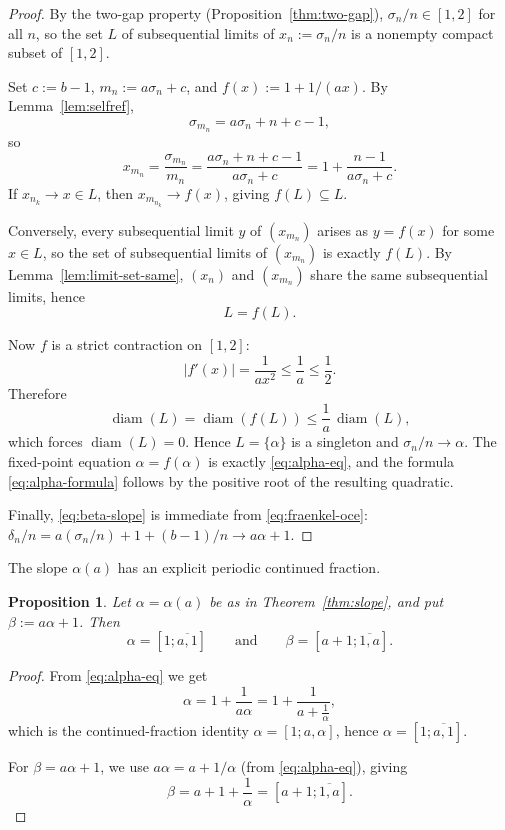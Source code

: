 \documentclass[11pt]{article}
\numberwithin{equation}{section}
\theoremstyle{plain}
\newtheorem{proposition}[theorem]{Proposition}
\theoremstyle{definition}
\theoremstyle{remark}
\begin{document}
\begin{proof}
By the two-gap property (Proposition~\ref{thm:two-gap}), $\sigma_n/n\in[1,2]$
for all $n$, so the set $L$ of subsequential limits of $x_n:=\sigma_n/n$ is a
nonempty compact subset of $[1,2]$.

Set $c:=b-1$, $m_n:=a\sigma_n+c$, and $f(x):=1+1/(ax)$.
By Lemma~\ref{lem:selfref},
\[
  \sigma_{m_n} = a\sigma_n + n + c - 1,
\]
so
\[
  x_{m_n}
  = \frac{\sigma_{m_n}}{m_n}
  = \frac{a\sigma_n+n+c-1}{a\sigma_n+c}
  = 1 + \frac{n-1}{a\sigma_n+c}.
\]
If $x_{n_k}\to x\in L$, then $x_{m_{n_k}}\to f(x)$, giving $f(L)\subseteq L$.

Conversely, every subsequential limit $y$ of $(x_{m_n})$ arises as $y=f(x)$
for some $x\in L$, so the set of subsequential limits of $(x_{m_n})$ is exactly
$f(L)$.  By Lemma~\ref{lem:limit-set-same}, $(x_n)$ and $(x_{m_n})$ share the
same subsequential limits, hence
\[
  L = f(L).
\]

Now $f$ is a strict contraction on $[1,2]$:
\[
  |f'(x)| = \frac{1}{ax^2} \le \frac{1}{a} \le \frac{1}{2}.
\]
Therefore
\[
  \operatorname{diam}(L)
  = \operatorname{diam}(f(L))
  \le \frac{1}{a}\,\operatorname{diam}(L),
\]
which forces $\operatorname{diam}(L)=0$.  Hence $L=\{\alpha\}$ is a singleton and
$\sigma_n/n\to\alpha$.  The fixed-point equation $\alpha=f(\alpha)$ is exactly
\eqref{eq:alpha-eq}, and the formula \eqref{eq:alpha-formula} follows by the
positive root of the resulting quadratic.

Finally, \eqref{eq:beta-slope} is immediate from \eqref{eq:fraenkel-oce}:
$\delta_n/n = a(\sigma_n/n)+1+(b-1)/n \to a\alpha+1$.
\end{proof}

The slope $\alpha(a)$ has an explicit periodic continued fraction.

\begin{proposition}\label{prop:cf}
Let $\alpha=\alpha(a)$ be as in Theorem~\ref{thm:slope}, and put
$\beta:=a\alpha+1$. Then
\[
  \alpha = [1;\overline{a,1}]
  \qquad\text{and}\qquad
  \beta = [a+1;\overline{1,a}].
\]
\end{proposition}

\begin{proof}
From \eqref{eq:alpha-eq} we get
\[
  \alpha = 1+\frac{1}{a\alpha}
  = 1 + \frac{1}{a + \frac{1}{\alpha}},
\]
which is the continued-fraction identity
$\alpha=[1;a,\alpha]$, hence $\alpha=[1;\overline{a,1}]$.

For $\beta=a\alpha+1$, we use $a\alpha = a + 1/\alpha$
(from \eqref{eq:alpha-eq}), giving
\[
  \beta = a + 1 + \frac{1}{\alpha} = [a+1;\overline{1,a}].
\]
\end{proof}
\end{document}
